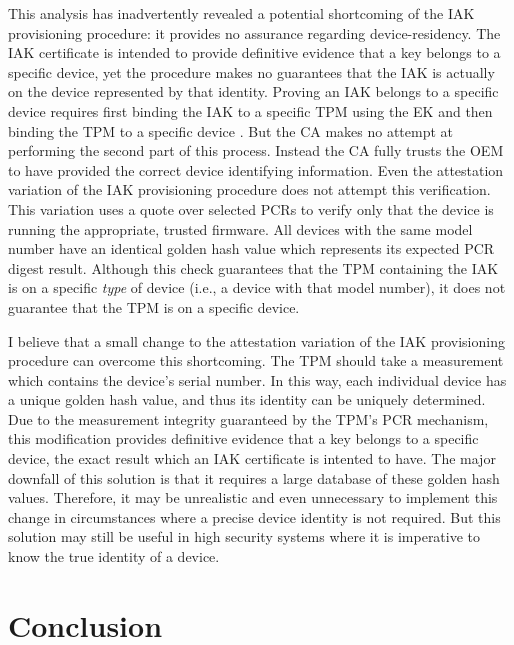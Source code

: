 \documentclass[runningheads]{llncs}
\begin{document}
This analysis has inadvertently revealed a potential shortcoming of the IAK provisioning procedure: it provides no assurance regarding device-residency.
The IAK certificate is intended to provide definitive evidence that a key belongs to a specific device, yet the procedure makes no guarantees that the IAK is actually on the device represented by that identity.
Proving an IAK belongs to a specific device requires first binding the IAK to a specific TPM using the EK and then binding the TPM to a specific device \cite{DevIDSpec-TCG}. 
But the CA makes no attempt at performing the second part of this process. Instead the CA fully trusts the OEM to have provided the correct device identifying information. 
Even the attestation variation of the IAK provisioning procedure does not attempt this verification. This variation uses a quote over selected PCRs to verify only that the device is running the appropriate, trusted firmware. All devices with the same model number have an identical golden hash value which represents its expected PCR digest result.
Although this check guarantees that the TPM containing the IAK is on a specific \textit{type} of device (i.e., a device with that model number), it does not guarantee that the TPM is on a specific device. 

I believe that a small change to the attestation variation of the IAK provisioning procedure can overcome this shortcoming. The TPM should take a measurement which contains the device's serial number. In this way, each individual device has a unique golden hash value, and thus its identity can be uniquely determined.
Due to the measurement integrity guaranteed by the TPM's PCR mechanism, this modification provides definitive evidence that a key belongs to a specific 
device, the exact result which an IAK certificate is intented to have. The major downfall of this solution is that it requires a large database of these golden hash values. Therefore, it may be unrealistic and even unnecessary to implement this change in circumstances where a precise device identity is not required. But this solution may still be useful in high security systems where it is imperative to know the true identity of a device.
%
%
%
\section{Conclusion}
\end{document}
